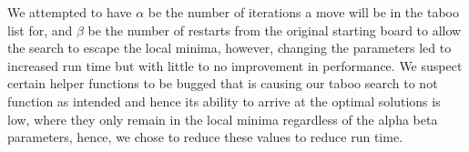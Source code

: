 We attempted to have $\alpha$ be the number of iterations a move will be in the taboo list for, and $\beta$ be the number of restarts from the original starting board to allow the search to escape the local minima, however, changing the parameters led to increased run time but with little to no improvement in performance. We suspect certain helper functions to be bugged that is causing our taboo search to not function as intended and hence its ability to arrive at the optimal solutions is low, where they only remain in the local minima regardless of the alpha beta parameters, hence, we chose to reduce these values to reduce run time.
%
\newcommand{\TimeoutSLS}{\todo{300.0}}  %
\newcommand{\RunsSLS}{\todo{5}}         %
%
%

